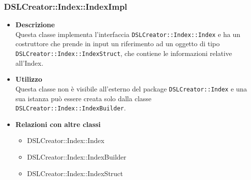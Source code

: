  \subsubsection{DSLCreator::Index::IndexImpl}
                    \begin{itemize}
                        \item \textbf{Descrizione} \hfill \\
                          Questa classe implementa l'interfaccia \texttt{DSLCreator::Index::Index} e ha un costruttore che prende in input un riferimento ad un oggetto di tipo \texttt{DSLCrea\-tor::Index::IndexStruct}, che contiene le informazioni relative all'Index.
                        \item \textbf{Utilizzo} \hfill \\
                          Questa classe non è visibile all'esterno del package \texttt{DSLCreator::Index} e una sua istanza può essere creata solo dalla classe \texttt{DSLCreator::Index::IndexBuilder}.
                        \item \textbf{Relazioni con altre classi}
                            \begin{itemize}
                              \item DSLCreator::Index::Index
                              \item DSLCreator::Index::IndexBuilder
                              \item DSLCreator::Index::IndexStruct
                            \end{itemize}
                    \end{itemize}

